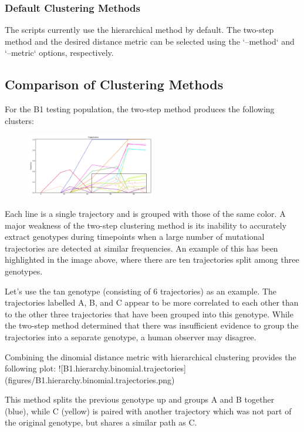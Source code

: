 \documentclass{report}
\begin{document}
\subsubsection{Default Clustering Methods}

The scripts currently use the hierarchical method by default.
The two-step method and the desired distance metric can be selected using the `--method` and `--metric` options, respectively.

\subsection{Comparison of Clustering Methods}

For the B1 testing population, the two-step method produces the following clusters:
\begin{figure}
\includegraphics[width=0.5\textwidth]{B1_twostep_trajectories}
\end{figure}
Each line is a single trajectory and is grouped with those of the same color. A major weakness of the two-step clustering method is its inability to accurately extract genotypes during timepoints when a large number of mutational trajectories are detected at similar frequencies. An example of this has been highlighted in the image above, where there are ten trajectories split among three genotypes.

Let's use the tan genotype (consisting of 6 trajectories) as an example. The trajectories labelled A, B, and C appear to be more correlated to each other than to the other three trajectories that have been grouped into this genotype. While the two-step method determined that there was insufficient evidence to group the trajectories into a separate genotype, a human observer may disagree.

Combining the dinomial distance metric with hierarchical clustering provides the following plot:
![B1.hierarchy.binomial.trajectories](figures/B1.hierarchy.binomial.trajectories.png)

This method splits the previous genotype up and groups A and B together (blue), while C (yellow) is paired with another trajectory which was not part of the original genotype, but shares a similar path as C.
\end{document}
